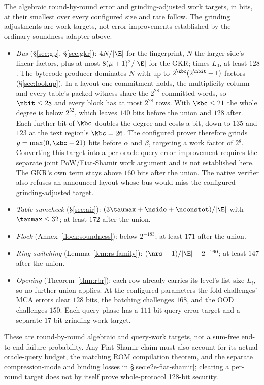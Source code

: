 The algebraic round-by-round error and grinding-adjusted work targets, in bits, at their smallest over every configured size and rate follow. The grinding adjustments are work targets, not error improvements established by the ordinary-soundness adapter above.
\begin{itemize}[itemsep=1pt,topsep=3pt]
\item \emph{Bus} (\S\ref{sec:gp}, \S\ref{sec:gkr}): $4N/|\E|$ for the fingerprint, $N$ the larger side's linear factors, plus at most $8(\mu+1)^2/|\E|$ for the GKR; times $L_0$, at least $128$. The bytecode producer dominates $N$ with up to $2^{\kbc}(2^{\nbit}-1)$ factors (\S\ref{sec:lookup}). In a layout one commitment holds, the multiplicity column and every table's packed witness share the $2^{28}$ committed words, so $\nbit\le28$ and every block has at most $2^{28}$ rows. With $\kbc\le21$ the whole degree is below $2^{52}$, which leaves $140$ bits before the union and $128$ after. Each further bit of $\kbc$ doubles the degree and costs a bit, down to $135$ and $123$ at the text region's $\kbc=26$. The configured prover therefore grinds $g=\max(0,\kbc-21)$ bits before $\alpha$ and $\beta$, targeting a work factor of $2^g$. Converting this target into a per-oracle-query error improvement requires the separate joint PoW/Fiat-Shamir work argument and is not established here. The GKR's own term stays above $160$ bits after the union. The native verifier also refuses an announced layout whose bus would miss the configured grinding-adjusted target.
\item \emph{Table sumcheck} (\S\ref{sec:air}): $(3\taumax+\nside+\nconstot)/|\E|$ with $\taumax\le32$; at least $172$ after the union.
\item \emph{Flock} (Annex~\ref{flock:soundness}): below $2^{-183}$; at least $171$ after the union.
\item \emph{Ring switching} (Lemma~\ref{lem:rs-family}): $(\nrs-1)/|\E|+2^{-160}$; at least $147$ after the union.
\item \emph{Opening} (Theorem~\ref{thm:rbr}): each row already carries its level's list size $L_i$, so no further union applies. At the configured parameters the fold challenges' MCA errors clear $128$ bits, the batching challenges $168$, and the OOD challenges $150$. Each query phase has a $111$-bit query-error target and a separate $17$-bit grinding-work target.
\end{itemize}
These are round-by-round algebraic and query-work targets, not a sum-free end-to-end failure probability. Any Fiat-Shamir claim must also account for its actual oracle-query budget, the matching ROM compilation theorem, and the separate compression-mode and binding losses in \S\ref{sec:e2e-fiat-shamir}; clearing a per-round target does not by itself prove whole-protocol 128-bit security.
